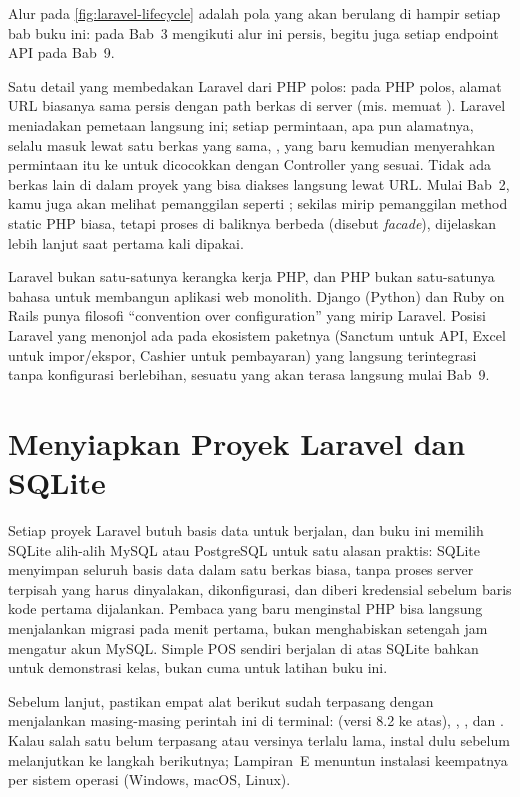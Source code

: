Alur pada \cref{fig:laravel-lifecycle} adalah pola yang akan berulang di
hampir setiap bab buku ini:  pada Bab~3 mengikuti alur ini
persis, begitu juga setiap endpoint API pada Bab~9.

Satu detail yang membedakan Laravel dari PHP polos: pada PHP polos, alamat
URL biasanya sama persis dengan path berkas di server (mis.
 memuat ). Laravel meniadakan pemetaan
langsung ini; setiap permintaan, apa pun alamatnya, selalu masuk lewat satu
berkas yang sama, , yang baru kemudian menyerahkan
permintaan itu ke  untuk dicocokkan dengan Controller
yang sesuai. Tidak ada berkas lain di dalam proyek yang bisa diakses
langsung lewat URL. Mulai Bab~2, kamu juga akan melihat pemanggilan seperti
; sekilas mirip pemanggilan method static PHP biasa,
tetapi proses di baliknya berbeda (disebut \textit{facade}), dijelaskan
lebih lanjut saat pertama kali dipakai.

\begin{notebox}
Laravel bukan satu-satunya kerangka kerja PHP, dan PHP bukan satu-satunya
bahasa untuk membangun aplikasi web monolith. Django (Python) dan Ruby on
Rails punya filosofi ``convention over configuration'' yang mirip Laravel.
Posisi Laravel yang menonjol ada pada ekosistem
paketnya (Sanctum untuk API, Excel untuk impor/ekspor, Cashier untuk
pembayaran) yang langsung terintegrasi tanpa konfigurasi berlebihan, sesuatu
yang akan terasa langsung mulai Bab~9.
\end{notebox}

\section{Menyiapkan Proyek Laravel dan SQLite}
\label{sec:arsitektur-web-modern-2}

Setiap proyek Laravel butuh basis data untuk berjalan, dan buku ini memilih
SQLite alih-alih MySQL atau PostgreSQL untuk satu alasan praktis: SQLite
menyimpan seluruh basis data dalam satu berkas biasa, tanpa proses server
terpisah yang harus dinyalakan, dikonfigurasi, dan diberi kredensial
sebelum baris kode pertama dijalankan. Pembaca yang baru menginstal PHP
bisa langsung menjalankan migrasi pada menit pertama, bukan menghabiskan
setengah jam mengatur akun MySQL. Simple POS sendiri berjalan di atas
SQLite bahkan untuk demonstrasi kelas, bukan cuma untuk latihan buku ini.

\begin{tipbox}
Sebelum lanjut, pastikan empat alat berikut sudah terpasang dengan
menjalankan masing-masing perintah ini di terminal:  (versi
8.2 ke atas), , , dan .
Kalau salah satu belum terpasang atau versinya terlalu lama, instal dulu
sebelum melanjutkan ke langkah berikutnya; Lampiran~E menuntun instalasi
keempatnya per sistem operasi (Windows, macOS, Linux).
\end{tipbox}

